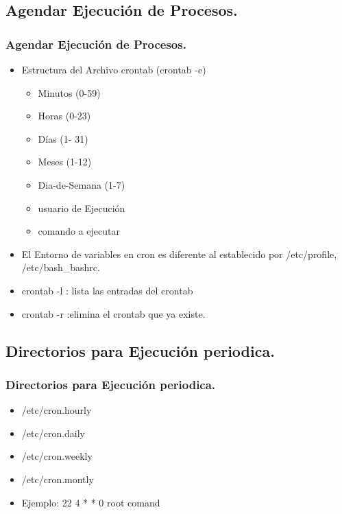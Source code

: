 \documentclass{beamer}
\begin{document}
\subsection{Agendar Ejecuci\'on de Procesos.}
\begin{frame}
\frametitle{Agendar Ejecuci\'on de Procesos.}
\begin{itemize}
\item Estructura del Archivo crontab (crontab -e)
        \begin{itemize}
        \item Minutos (0-59)
        \item Horas (0-23)
        \item D\'ias (1- 31)
        \item Meses (1-12)
        \item Dia-de-Semana (1-7)
        \item usuario de Ejecuci\'on
        \item comando a ejecutar
        \end{itemize}
\item El Entorno de variables en cron es diferente al establecido por /etc/profile, /etc/bash\_bashrc.
\item crontab -l : lista las entradas del crontab
\item crontab -r :elimina el crontab que ya existe.
\end{itemize}
\end{frame}

\subsection{Directorios para Ejecuci\'on periodica.}
\begin{frame}
\frametitle{Directorios para Ejecuci\'on periodica.}
\begin{itemize}
\item /etc/cron.hourly
\item /etc/cron.daily
\item /etc/cron.weekly
\item /etc/cron.montly
\item Ejemplo: 22 4 * * 0 root comand
\end{itemize}
\end{frame}
\end{document}
